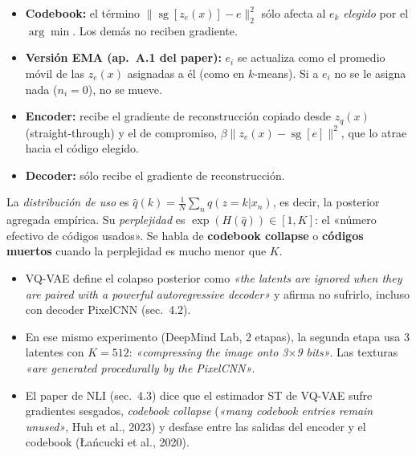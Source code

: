 \documentclass[11pt,a4paper]{article}
\newcommand{\sg}{\operatorname{sg}}
\begin{document}
\begin{definicion}
\begin{itemize}[leftmargin=*]
  \item \textbf{Codebook:} el término $\|\sg[z_e(x)]-e\|_2^2$ sólo afecta al $e_k$ \emph{elegido} por el $\arg\min$. Los demás no reciben gradiente.
  \item \textbf{Versión EMA (ap.~A.1 del paper):} $e_i$ se actualiza como el promedio móvil de las $z_e(x)$ asignadas a él (como en $k$-means). Si a $e_i$ no se le asigna nada ($n_i=0$), no se mueve.
  \item \textbf{Encoder:} recibe el gradiente de reconstrucción copiado desde $z_q(x)$ (straight-through) y el de compromiso, $\beta\|z_e(x)-\sg[e]\|^2$, que lo atrae hacia el código elegido.
  \item \textbf{Decoder:} sólo recibe el gradiente de reconstrucción.
\end{itemize}
\end{definicion}

\begin{definicion}
La \emph{distribución de uso} es $\hat q(k)=\frac1N\sum_{n}q(z=k|x_n)$, es decir, la posterior agregada empírica. Su \emph{perplejidad} es $\exp(H(\hat q))\in[1,K]$: el «número efectivo de códigos usados». Se habla de \textbf{codebook collapse} o \textbf{códigos muertos} cuando la perplejidad es mucho menor que $K$.
\end{definicion}

\begin{evidencia}
\begin{itemize}[leftmargin=*]
  \item VQ-VAE define el colapso posterior como \emph{«the latents are ignored when they are paired with a powerful autoregressive decoder»} y afirma no sufrirlo, incluso con decoder PixelCNN (sec.~4.2).
  \item En ese mismo experimento (DeepMind Lab, 2 etapas), la segunda etapa usa 3 latentes con $K=512$: \emph{«compressing the image onto 3$\times$9 bits»}. Las texturas \emph{«are generated procedurally by the PixelCNN»}.
  \item El paper de NLI (sec.~4.3) dice que el estimador ST de VQ-VAE sufre gradientes sesgados, \emph{codebook collapse} (\emph{«many codebook entries remain unused»}, Huh et al., 2023) y desfase entre las salidas del encoder y el codebook (Łańcucki et al., 2020).
\end{itemize}
\end{evidencia}
\end{document}
